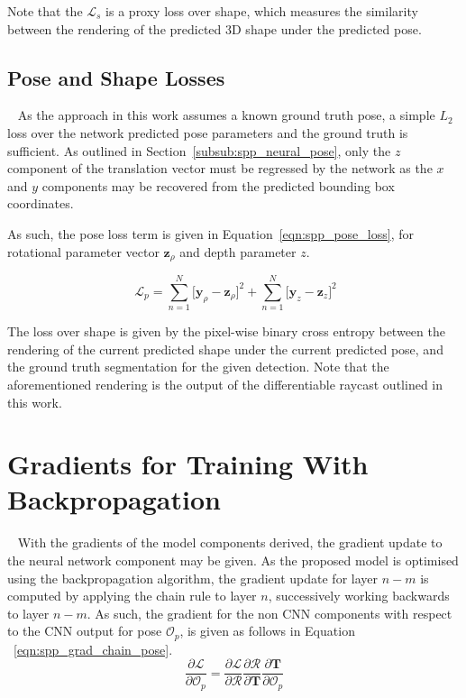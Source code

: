 Note that the \( \mathcal{L}_{s} \) is a proxy loss over shape, which measures the similarity between 
the rendering of the predicted 3D shape under the predicted pose.

\subsection{Pose and Shape Losses}
~\label{sec:spp_pose_loss}
As the approach in this work assumes a known ground truth pose, a simple \( L_{2} \) loss over the 
network predicted pose parameters and the ground truth is sufficient. As outlined in Section~\ref{subsub:spp_neural_pose}, 
only the \( z \) component of the translation vector must be regressed by the network as the \( x \) and 
\( y \) components may be recovered from the predicted bounding box coordinates.

As such, the pose loss term is given in Equation~\ref{eqn:spp_pose_loss}, for rotational parameter vector 
\( \bm{z}_{\rho} \) and depth parameter \( z \).

\begin{equation}
  ~\label{eqn:spp_pose_loss}
  \mathcal{L}_{p} = \sum_{n=1}^{N} \Big[ \bm{y}_{\rho} - \bm{z}_{\rho} \Big]^{2} +
  \sum_{n=1}^{N} \Big[ \bm{y}_{z} - \bm{z}_{z} \Big]^{2}
\end{equation}

The loss over shape is given by the pixel-wise binary cross entropy between the rendering of the current predicted shape under the 
current predicted pose, and the ground truth segmentation for the given detection. Note that the aforementioned rendering is the 
output of the differentiable raycast outlined in this work.

\section{Gradients for Training With Backpropagation}
~\label{sec:spp_backprop}
With the gradients of the model components derived, the gradient update to the neural network component 
may be given. As the proposed model is optimised using the backpropagation algorithm, 
the gradient update for layer \( n - m \) is computed by applying the chain rule to layer \( n \), 
successively working backwards to layer \( n - m \). As such, the gradient for the non CNN components 
with respect to the CNN output for pose \( \mathcal{O}_{p} \), is given as follows in Equation
~\ref{eqn:spp_grad_chain_pose}.
\begin{equation}
  \label{eqn:spp_grad_chain_pose}
  \frac{\partial \mathcal{L}}{\partial \mathcal{O}_{p}} = 
    \frac{\partial \mathcal{L}}{\partial \mathcal{R}}
    \frac{\partial \mathcal{R}}{\partial \bm{T}}
    \frac{\partial \bm{T}}{\partial \mathcal{O}_{p}}
\end{equation}

